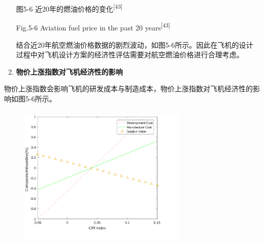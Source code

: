 \documentclass[12pt]{article}
\begin{document}
\begin{enumerate}

\par

\begin{Center}
图5-6 近20年的燃油价格的变化\textsuperscript{[43]}
\end{Center}\par

\begin{Center}
Fig.5-6 Aviation fuel price in the past 20 years\textsuperscript{[43]}
\end{Center}\par

结合近20年航空燃油价格数据的剧烈波动，如图5-6所示。因此在飞机的设计过程中对飞机设计方案的经济性评估需要对航空燃油价格进行合理考虑。\par

	\item \textbf{物价上涨指数对飞机经济性的影响}
\end{enumerate}\par

物价上涨指数会影响飞机的研发成本与制造成本，物价上涨指数对飞机经济性的影响如图5-6所示。\par




\begin{figure}[H]
	\begin{Center}
		\includegraphics[width=3.17in,height=2.73in]{./media512/image4.pdf}
	\end{Center}
\end{figure}



\par
\end{document}

